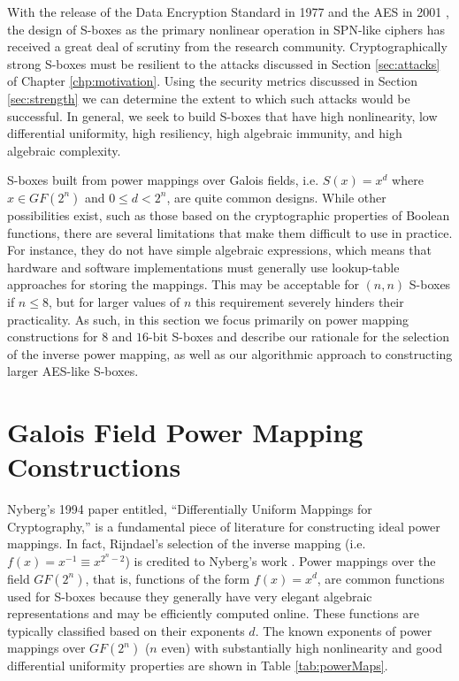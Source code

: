 With the release of the Data Encryption Standard in 1977 \cite{DES-FIPS} and the AES in 2001 \cite{daemen01-AES}, the design of S-boxes as the primary nonlinear operation in SPN-like ciphers has received a great deal of scrutiny from the research community. Cryptographically strong S-boxes must be resilient to the attacks discussed in Section \ref{sec:attacks} of Chapter \ref{chp:motivation}. Using the security metrics discussed in Section \ref{sec:strength} we can determine the extent to which such attacks would be successful. In general, we seek to build S-boxes that have high nonlinearity, low differential uniformity, high resiliency, high algebraic immunity, and high algebraic complexity. 

S-boxes built from power mappings over Galois fields, i.e. $S(x) = x^d$ where $x \in GF(2^n)$ and $0 \leq d < 2^n$, are quite common designs. While other possibilities exist, such as those based on the cryptographic properties of Boolean functions, there are several limitations that make them difficult to use in practice. For instance, they do not have simple algebraic expressions, which means that hardware and software implementations must generally use lookup-table approaches for storing the mappings. This may be acceptable for $(n,n)$ S-boxes if $n \leq 8$, but for larger values of $n$ this requirement severely hinders their practicality. As such, in this section we focus primarily on power mapping constructions for $8$ and $16$-bit S-boxes and describe our rationale for the selection of the inverse power mapping, as well as our algorithmic approach to constructing larger AES-like S-boxes.

\section{Galois Field Power Mapping Constructions}
Nyberg's 1994 paper entitled, ``Differentially Uniform Mappings for Cryptography,'' \cite{Nyberg94-1} is a fundamental piece of literature for constructing ideal power mappings. In fact, Rijndael's selection of the inverse mapping (i.e. $f(x) = x^{-1} \equiv x^{2^{n} - 2}$) is credited to Nyberg's work \cite{Daemen02-1}. Power mappings over the field $GF(2^n)$, that is, functions of the form $f(x) = x^d$, are common functions used for S-boxes because they generally have very elegant algebraic representations and may be efficiently computed online. These functions are typically classified based on their exponents $d$. The known exponents of power mappings over $GF(2^n)$ ($n$ even) with substantially high nonlinearity and good differential uniformity properties are shown in Table \ref{tab:powerMaps}.

